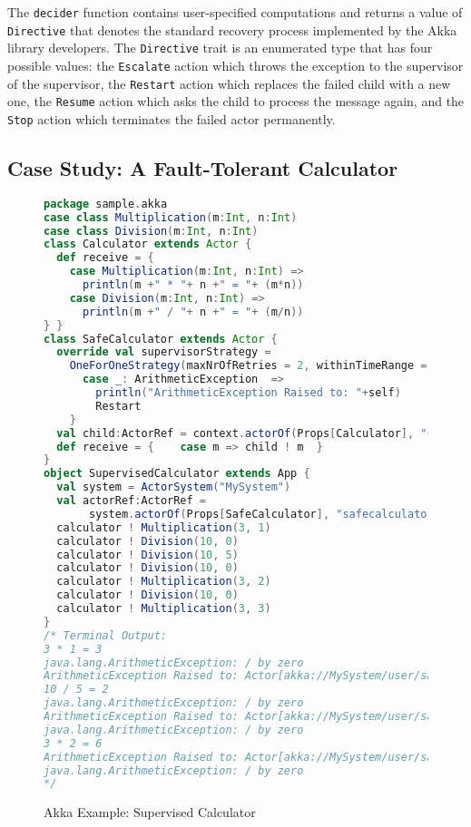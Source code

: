 The {\tt decider} function contains user-specified computations and returns a 
value of {\tt Directive} that denotes the standard recovery process implemented 
by the Akka library developers.  The {\tt Directive} trait is an enumerated 
type that has four possible values: the
{\tt Escalate} action which throws the exception to the supervisor of the 
supervisor, the {\tt Restart} action which replaces the failed child with a new 
one, the {\tt Resume} action which asks the child to process the message again, 
and the {\tt Stop} action which terminates the failed actor permanently.


\begin{comment}
\subsubsection{System Configuration}
\subsubsection{Distributed and Cluster Programming}
\end{comment}


\subsection{Case Study: A Fault-Tolerant Calculator}



\begin{figure}[p]
  \begin{lstlisting}[language=scala]
package sample.akka
case class Multiplication(m:Int, n:Int)
case class Division(m:Int, n:Int)
class Calculator extends Actor {
  def receive = {
    case Multiplication(m:Int, n:Int) =>
      println(m +" * "+ n +" = "+ (m*n))
    case Division(m:Int, n:Int) =>
      println(m +" / "+ n +" = "+ (m/n))
} }
class SafeCalculator extends Actor {
  override val supervisorStrategy =
    OneForOneStrategy(maxNrOfRetries = 2, withinTimeRange = 1 minute) {
      case _: ArithmeticException  =>
        println("ArithmeticException Raised to: "+self)
        Restart
    }
  val child:ActorRef = context.actorOf(Props[Calculator], "child")
  def receive = {    case m => child ! m  }
}
object SupervisedCalculator extends App {
  val system = ActorSystem("MySystem")
  val actorRef:ActorRef = 
       system.actorOf(Props[SafeCalculator], "safecalculator")
  calculator ! Multiplication(3, 1)
  calculator ! Division(10, 0)
  calculator ! Division(10, 5)
  calculator ! Division(10, 0)
  calculator ! Multiplication(3, 2)
  calculator ! Division(10, 0)
  calculator ! Multiplication(3, 3)
}
/* Terminal Output:
3 * 1 = 3
java.lang.ArithmeticException: / by zero
ArithmeticException Raised to: Actor[akka://MySystem/user/safecalculator]
10 / 5 = 2
java.lang.ArithmeticException: / by zero
ArithmeticException Raised to: Actor[akka://MySystem/user/safecalculator]
java.lang.ArithmeticException: / by zero
3 * 2 = 6
ArithmeticException Raised to: Actor[akka://MySystem/user/safecalculator]
java.lang.ArithmeticException: / by zero
*/
    \end{lstlisting}
  \caption{Akka Example: Supervised Calculator}
  \label{akka_supervised_calculator}
\end{figure}


